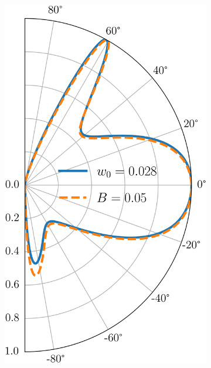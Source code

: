     \begin{figure}[H] %
    \centering
        \begin{subfigure}[b]{0.3\linewidth}
            \includegraphics[width=\linewidth]{fig/pseudo B field/Ef0.0832 U0.285 B0.05 w0.028.png}
            \caption{}
            \label{fig:pseudo1}
        \end{subfigure}
        \begin{subfigure}[b]{0.3\linewidth}

\end{subfigure}
\end{figure}
